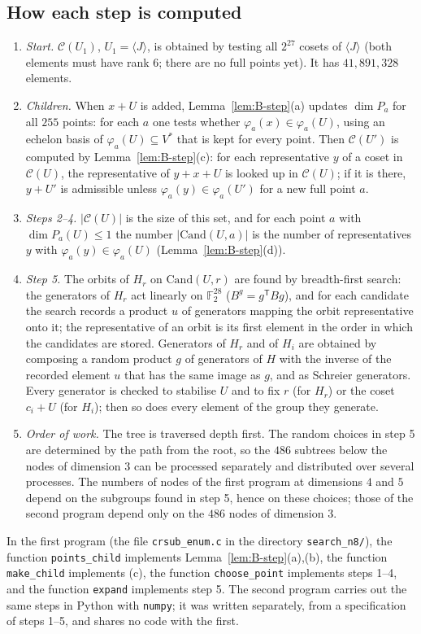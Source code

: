 \documentclass[11pt]{article}
\theoremstyle{definition}
\newcommand{\F}{\mathbb{F}}
\begin{document}
\subsection{How each step is computed}\label{app:compute}
\begin{enumerate}
\item \emph{Start.} $\mathcal C(U_1)$, $U_1=\langle J\rangle$, is obtained by testing all $2^{27}$
cosets of $\langle J\rangle$ (both elements must have rank $6$; there are no full points yet). It
has $41{,}891{,}328$ elements.
\item \emph{Children.} When $x+U$ is added, Lemma~\ref{lem:B-step}(a) updates $\dim P_a$ for
all $255$ points: for each $a$ one tests whether $\varphi_a(x)\in\varphi_a(U)$, using an echelon
basis of $\varphi_a(U)\subseteq V^*$ that is kept for every point. Then $\mathcal C(U')$ is
computed by Lemma~\ref{lem:B-step}(c): for each representative $y$ of a coset in $\mathcal C(U)$,
the representative of $y+x+U$ is looked up in $\mathcal C(U)$; if it is there, $y+U'$ is
admissible unless $\varphi_a(y)\in\varphi_a(U')$ for a new full point $a$.
\item \emph{Steps 2--4.} $|\mathcal C(U)|$ is the size of this set, and for each point $a$ with
$\dim P_a(U)\le1$ the number $|\mathrm{Cand}(U,a)|$ is the number of representatives $y$ with
$\varphi_a(y)\in\varphi_a(U)$ (Lemma~\ref{lem:B-step}(d)).
\item \emph{Step 5.} The orbits of $H_r$ on $\mathrm{Cand}(U,r)$ are found by breadth-first
search: the generators of $H_r$ act linearly on $\F_2^{28}$ ($B^g=g^{\mathsf T}Bg$), and for each
candidate the search records a product $u$ of generators mapping the orbit representative onto
it; the representative of an orbit is its first element in the order in which the candidates
are stored. Generators of $H_r$ and of $H_i$ are obtained by composing a random product $g$ of
generators of $H$ with the inverse of the recorded element $u$ that has the same image as $g$,
and as Schreier generators. Every generator is checked to stabilise $U$ and to fix $r$ (for $H_r$) or
the coset $c_i+U$ (for $H_i$); then so does every element of the group they generate.
\item \emph{Order of work.} The tree is traversed depth first. The random choices in step 5 are
determined by the path from the root, so the $486$ subtrees below the nodes of dimension $3$
can be processed separately and distributed over several processes. The numbers of nodes of
the first program at dimensions $4$ and $5$ depend on the subgroups found in step 5, hence on
these choices; those of the second program depend only on the $486$ nodes of dimension $3$.
\end{enumerate}
In the first program (the file \texttt{crsub\_enum.c} in the directory \texttt{search\_n8/}), the
function \texttt{points\_child} implements Lemma~\ref{lem:B-step}(a),(b), the function
\texttt{make\_child} implements (c), the function \texttt{choose\_point} implements steps 1--4,
and the function \texttt{expand} implements step 5. The second program carries out the same steps in Python with \texttt{numpy}; it was
written separately, from a specification of steps 1--5, and shares no code with the first.
\end{document}
